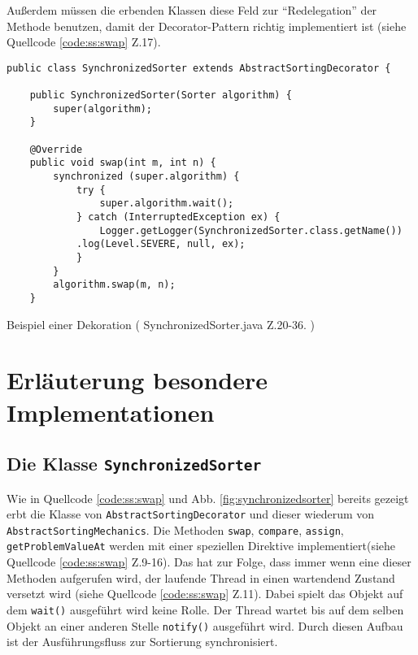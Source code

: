 \noindent Außerdem müssen die erbenden Klassen diese Feld zur "`Redelegation"' der Methode benutzen, damit der Decorator-Pattern richtig
implementiert ist (siehe Quellcode \ref{code:ss:swap} Z.17).

\begin{listing}[H]
    \begin{verbatim}
public class SynchronizedSorter extends AbstractSortingDecorator {

    public SynchronizedSorter(Sorter algorithm) {
        super(algorithm);
    }

    @Override
    public void swap(int m, int n) {
        synchronized (super.algorithm) {
            try {
                super.algorithm.wait();
            } catch (InterruptedException ex) {
                Logger.getLogger(SynchronizedSorter.class.getName())
            .log(Level.SEVERE, null, ex);
            }
        }
        algorithm.swap(m, n);
    }
    \end{verbatim}
    \caption{ Beispiel einer Dekoration ( SynchronizedSorter.java Z.20-36. )}
    \label{code:ss:swap}
\end{listing}

\section{Erläuterung besondere Implementationen}
\subsection{Die Klasse \texttt{SynchronizedSorter}}

\begin{wrapfigure}{r}{0.4\textwidth}
\vspace{-40pt}
  \begin{center}
  \end{center}
  \vspace{-20pt}
  \vspace{-10pt}
\end{wrapfigure}
Wie in Quellcode \ref{code:ss:swap} und Abb. \ref{fig:synchronizedsorter} bereits gezeigt erbt die Klasse von \texttt{AbstractSortingDecorator} 
und dieser wiederum von \texttt{AbstractSortingMechanics}. 
Die Methoden \texttt{swap}, \texttt{compare}, \texttt{assign}, \newline \texttt{getProblemValueAt} werden mit einer 
speziellen Direktive implementiert(siehe Quellcode \ref{code:ss:swap} Z.9-16). Das hat zur Folge,
dass immer wenn eine dieser Methoden aufgerufen wird, der laufende Thread in einen wartendend Zustand versetzt wird
(siehe Quellcode \ref{code:ss:swap} Z.11). Dabei spielt das Objekt auf dem \texttt{wait()} ausgeführt wird keine Rolle. Der Thread wartet 
bis auf dem selben Objekt an einer anderen Stelle \texttt{notify()} ausgeführt wird. Durch diesen Aufbau ist der Ausführungsfluss zur Sortierung synchronisiert.

